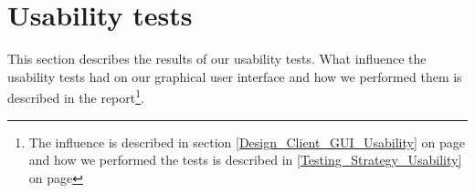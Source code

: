 \section{Usability tests}
\label{Appendix_Test_Table}
This section describes the results of our usability tests. What influence the usability tests had on our graphical user interface and how we performed them is described in the report\footnote{The influence is described in section \ref {Design_Client_GUI_Usability} on page \pageref{Design_Client_GUI_Usability} and how we performed the tests is described in \ref{Testing_Strategy_Usability} on page \pageref{Testing_Strategy_Usability}}.
